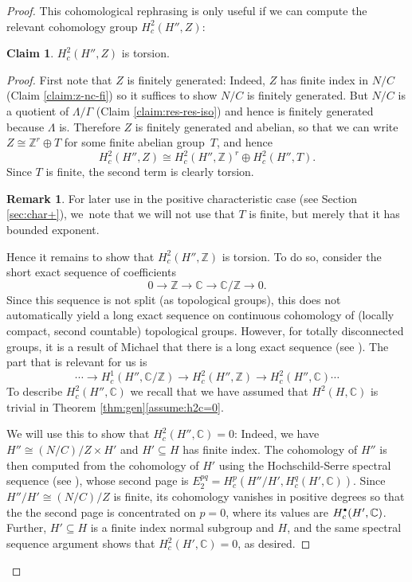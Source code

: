 \documentclass[11pt]{article}
\numberwithin{equation}{section}\providecommand{\llangle}{\langle\!\langle}\providecommand{\rrangle}{\rangle\!\rangle}\providecommand{\Asterisk}{\ast}
\newcommand{\cbullet}{{\raisebox{1pt}{$\scriptscriptstyle\bullet$}}}
\newcommand{\bbC}{\ensuremath{\mathbb{C}}}
\newcommand{\bbZ}{\ensuremath{\mathbb{Z}}}
\theoremstyle{definition}
\newtheorem{rem}[thm]{Remark}
\newtheorem{claim}[thm]{Claim}
\begin{document}
\begin{proof}
This cohomological rephrasing is only useful if we can compute the relevant cohomology group $H^2_c(H'',Z)$:

\begin{claim}\label{claim:h2-tor}
$H^2_c(H'',Z)$ is torsion.
\end{claim}
\begin{proof} First note that $Z$ is finitely generated: Indeed, $Z$ has finite index in $N/C$ (Claim \ref{claim:z-nc-fi}) so it suffices to show $N/C$ is finitely generated. But $N/C$ is a quotient of $\Lambda/\Gamma$ (Claim \ref{claim:res-res-iso}) and hence is finitely generated because $\Lambda$ is. Therefore $Z$ is finitely generated and abelian, so that we can write $Z\cong \bbZ^r \oplus T$ for some finite abelian group~$T$, and hence
\[
H^2_c(H'',Z)\cong H^2_c(H'',\bbZ)^r \oplus H^2_c(H'',T).
\]
Since $T$ is finite, the second term is clearly torsion.
\begin{rem} For later use in the positive characteristic case (see Section \ref{sec:char+}), we~note that we will not use that $T$ is finite, but merely that it has bounded exponent. \end{rem}
Hence it remains to show that $H^2_c(H'',\bbZ)$ is torsion. To do so, consider the short exact sequence of coefficients
\begin{equation}\label{eq:ses-coeff}
0\to \bbZ\to \bbC\to \bbC/\bbZ\to 0.
\end{equation}
Since this sequence is not split (as topological groups), this does not automatically yield a long exact sequence on continuous cohomology of (locally compact, second countable) topological groups. However, for totally disconnected groups, it is a result of Michael that there is a long exact sequence (see \cite[Th.\,M]{wigner-cohomology}). The part that is relevant for us is
\begin{equation}\label{eq:les-coeff}
\cdots \to H^1_c(H'',\bbC/\bbZ)\to H^2_c(H'',\bbZ)\to H^2_c(H'',\bbC) \cdots
\end{equation}
To describe $H^2_c(H'',\bbC)$ we recall that we have assumed that $H^2(H,\bbC)$ is trivial in
Theorem \ref{thm:gen}\eqref{assume:h2c=0}.

We will use this to show that $H^2_c(H'',\bbC)=0$: Indeed, we have $H''\cong (N/C)/Z\times H'$ and $H'\subseteq H$ has finite index. The cohomology of $H''$ is then computed from the cohomology of $H'$ using the Hochschild-Serre spectral sequence (see \cite[Prop.\,5]{casselman-wigner}), whose second page is $E_2^{pq}=H^p_c(H''/H', H^q_c(H',\bbC))$. Since $H''/H'\cong (N/C)/Z$ is finite, its cohomology vanishes in positive degrees so that the the second page is concentrated on $p=0$, where its values are $H^\cbullet_c(H',\bbC)$. Further, $H'\subseteq H$ is a finite index normal subgroup and $H$,
and the same spectral sequence argument shows that $H^2_c(H',\bbC)=0$, as desired.


\end{proof}
\end{proof}
\end{document}

